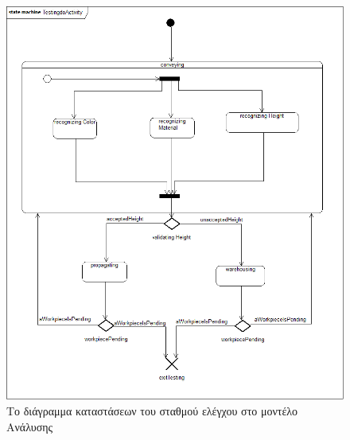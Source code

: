 \documentclass[a4paper,12pt,twoside]{report}
\begin{document}
\begin{appendices}
			\begin{figure}[hp]
					\centering
					\includegraphics[scale=0.30]{AnalysisModel_stm-TestingStation(Testingstate).png}
					\caption{Το διάγραμμα καταστάσεων του σταθμού ελέγχου στο μοντέλο Ανάλυσης}
					\label{φωτ:Το διάγραμμα καταστάσεων του σταθμού ελέγχου στο μοντέλο Ανάλυσης}
			\end{figure}
			

\end{appendices}
\end{document}
